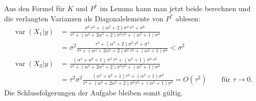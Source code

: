 Aus den Formel für $K$ und $P^*$ im Lemma kann man jetzt beide berechnen
und die verlangten Varianzen als Diagonalelemente von $P^*$ ablesen:
\begin{align*}
\operatorname{var}(X_1|y)
&=
\frac{\sigma^2\,\tau^4+(\alpha^2+2)\sigma^4\,\tau^2+\sigma^6
 }{\tau^4+(\alpha^4+2\alpha^2+2)\sigma^2\tau^2+(\alpha^2+1
 )\sigma^4}
\\
&=
\sigma^2
\frac{\tau^4+(\alpha^2+2)\sigma^2\,\tau^2+\sigma^4}%
{\tau^4+(\alpha^4+2\alpha^2+2)\sigma^2\,\tau^2+(\alpha^2+1
 )\sigma^4} < \sigma^2
\\
\operatorname{var}(X_3|y)
&=
\frac{(\alpha^4+a^2+1)\,\sigma^2\,\tau^4+(\alpha^2+1)\,
 \sigma^4\,\tau^2}{\tau^4+(\alpha^4+2\alpha^2+2)\sigma^2
 \tau^2+(\alpha^2+1)\sigma^4}
\\
&=
\tau^2\sigma^2
\frac{(\alpha^4+a^2+1)\tau^2+(\alpha^2+1)
 \sigma^2}{\tau^4+(\alpha^4+2\alpha^2+2)\sigma^2
 \tau^2+(\alpha^2+1)\sigma^4}
=
O(\tau^2)\qquad \text{für $\tau\to 0$}.
\end{align*}
Die Schlussfolgerungen der Aufgabe bleiben somit gültig.

